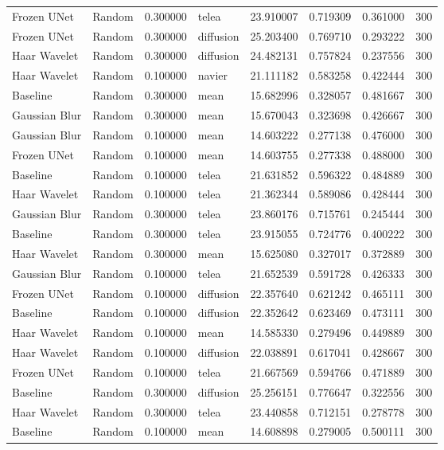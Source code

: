 \begin{table}[h]
\begin{tabular}{llrlrrrr}
Frozen UNet & Random & 0.300000 & telea & 23.910007 & 0.719309 & 0.361000 & 300 \\
Frozen UNet & Random & 0.300000 & diffusion & 25.203400 & 0.769710 & 0.293222 & 300 \\
Haar Wavelet & Random & 0.300000 & diffusion & 24.482131 & 0.757824 & 0.237556 & 300 \\
Haar Wavelet & Random & 0.100000 & navier & 21.111182 & 0.583258 & 0.422444 & 300 \\
Baseline & Random & 0.300000 & mean & 15.682996 & 0.328057 & 0.481667 & 300 \\
Gaussian Blur & Random & 0.300000 & mean & 15.670043 & 0.323698 & 0.426667 & 300 \\
Gaussian Blur & Random & 0.100000 & mean & 14.603222 & 0.277138 & 0.476000 & 300 \\
Frozen UNet & Random & 0.100000 & mean & 14.603755 & 0.277338 & 0.488000 & 300 \\
Baseline & Random & 0.100000 & telea & 21.631852 & 0.596322 & 0.484889 & 300 \\
Haar Wavelet & Random & 0.100000 & telea & 21.362344 & 0.589086 & 0.428444 & 300 \\
Gaussian Blur & Random & 0.300000 & telea & 23.860176 & 0.715761 & 0.245444 & 300 \\
Baseline & Random & 0.300000 & telea & 23.915055 & 0.724776 & 0.400222 & 300 \\
Haar Wavelet & Random & 0.300000 & mean & 15.625080 & 0.327017 & 0.372889 & 300 \\
Gaussian Blur & Random & 0.100000 & telea & 21.652539 & 0.591728 & 0.426333 & 300 \\
Frozen UNet & Random & 0.100000 & diffusion & 22.357640 & 0.621242 & 0.465111 & 300 \\
Baseline & Random & 0.100000 & diffusion & 22.352642 & 0.623469 & 0.473111 & 300 \\
Haar Wavelet & Random & 0.100000 & mean & 14.585330 & 0.279496 & 0.449889 & 300 \\
Haar Wavelet & Random & 0.100000 & diffusion & 22.038891 & 0.617041 & 0.428667 & 300 \\
Frozen UNet & Random & 0.100000 & telea & 21.667569 & 0.594766 & 0.471889 & 300 \\
Baseline & Random & 0.300000 & diffusion & 25.256151 & 0.776647 & 0.322556 & 300 \\
Haar Wavelet & Random & 0.300000 & telea & 23.440858 & 0.712151 & 0.278778 & 300 \\
Baseline & Random & 0.100000 & mean & 14.608898 & 0.279005 & 0.500111 & 300 \\
\bottomrule
\end{tabular}


\end{table}
